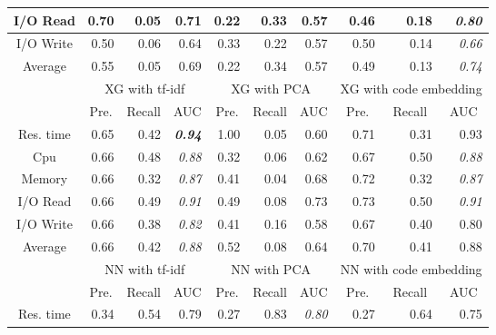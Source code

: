 \begin{table}
\begin{tabular}{|c|r|r|r|r|r|r|r|r|r|}
I/O Read          & 0.70  & 0.05    & 0.71 & 0.22  & 0.33    & 0.57 & 0.46  & 0.18    & \textit{0.80}            \\ \hline
I/O Write         & 0.50  & 0.06    & 0.64 & 0.33  & 0.22    & 0.57 & 0.50  & 0.14    & \textit{0.66}            \\ \hline
Average           & 0.55  & 0.05    & 0.69 & 0.22  & 0.34    & 0.57 & 0.49  & 0.13    & \textit{0.74}            \\ \hline
\multirow{2}{*}{} & \multicolumn{3}{c|}{XG with tf-idf}        & \multicolumn{3}{c|}{XG with PCA}           & \multicolumn{3}{c|}{XG with code embedding}\\ \cline{2-10} 
                  & \multicolumn{1}{c|}{Pre.} & \multicolumn{1}{c|}{Recall} & \multicolumn{1}{c|}{AUC} & \multicolumn{1}{c|}{Pre.} & \multicolumn{1}{c|}{Recall} & \multicolumn{1}{c|}{AUC} & \multicolumn{1}{c|}{Pre.} & \multicolumn{1}{c|}{Recall} & \multicolumn{1}{c|}{AUC} \\ \hline
Res. time         & 0.65  & 0.42    & \textit{\textbf{0.94}}   & 1.00  & 0.05    & 0.60 & 0.71  & 0.31    & 0.93 \\ \hline
Cpu               & 0.66  & 0.48    & \textit{0.88}            & 0.32  & 0.06    & 0.62 & 0.67  & 0.50    & \textit{0.88}            \\ \hline
Memory            & 0.66  & 0.32    & \textit{0.87}            & 0.41  & 0.04    & 0.68 & 0.72  & 0.32    & \textit{0.87}            \\ \hline
I/O Read          & 0.66  & 0.49    & \textit{0.91}            & 0.49  & 0.08    & 0.73 & 0.73  & 0.50    & \textit{0.91}            \\ \hline
I/O Write         & 0.66  & 0.38    & \textit{0.82}            & 0.41  & 0.16    & 0.58 & 0.67  & 0.40    & 0.80 \\ \hline
Average           & 0.66  & 0.42    & \textit{0.88}            & 0.52  & 0.08    & 0.64 & 0.70  & 0.41    & 0.88 \\ \hline
\multirow{2}{*}{} & \multicolumn{3}{c|}{NN with tf-idf}        & \multicolumn{3}{c|}{NN with PCA}           & \multicolumn{3}{c|}{NN with code embedding}\\ \cline{2-10} 
                  & \multicolumn{1}{c|}{Pre.} & \multicolumn{1}{c|}{Recall} & \multicolumn{1}{c|}{AUC} & \multicolumn{1}{c|}{Pre.} & \multicolumn{1}{c|}{Recall} & \multicolumn{1}{c|}{AUC} & \multicolumn{1}{c|}{Pre.} & \multicolumn{1}{c|}{Recall} & \multicolumn{1}{c|}{AUC} \\ \hline
Res. time         & 0.34  & 0.54    & 0.79 & 0.27  & 0.83    & \textit{0.80}            & 0.27  & 0.64    & 0.75 \\ \hline

\end{tabular}
\end{table}
